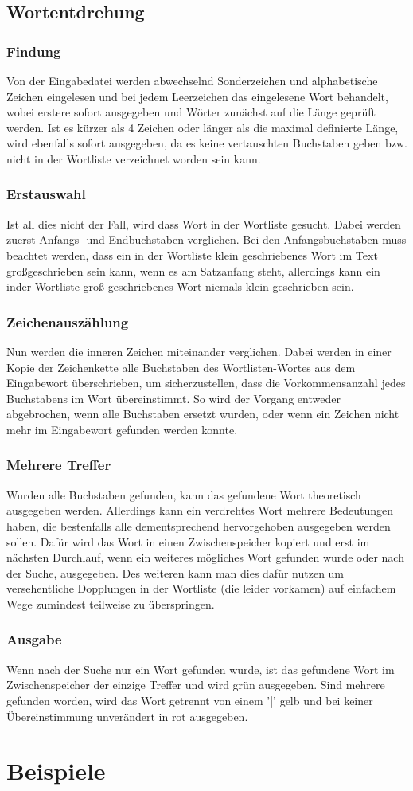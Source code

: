 \documentclass[a4paper,10pt,ngerman]{scrartcl}
\newcommand{\newsection}{\vspace{3\baselineskip}\section}
\newcommand{\newsubsection}{\vspace{2\baselineskip}\subsection}
\newcommand{\newsubsubsection}{\vspace{1\baselineskip}\subsubsection}
\begin{document}
\pagebreak
\newsubsection{Wortentdrehung}

\newsubsubsection{Findung}
Von der Eingabedatei werden abwechselnd Sonderzeichen und alphabetische Zeichen eingelesen und bei jedem Leerzeichen das eingelesene Wort behandelt, wobei erstere sofort ausgegeben und Wörter zunächst auf die Länge geprüft werden. Ist es kürzer als 4 Zeichen oder länger als die maximal definierte Länge, wird ebenfalls sofort ausgegeben, da es keine vertauschten Buchstaben geben bzw. nicht in der Wortliste verzeichnet worden sein kann.

\newsubsubsection{Erstauswahl}
Ist all dies nicht der Fall, wird dass Wort in der Wortliste gesucht. Dabei werden zuerst Anfangs- und Endbuchstaben verglichen. Bei den Anfangsbuchstaben muss beachtet werden, dass ein in der Wortliste klein geschriebenes Wort im Text großgeschrieben sein kann, wenn es am Satzanfang steht, allerdings kann ein inder Wortliste groß geschriebenes Wort niemals klein geschrieben sein.

\newsubsubsection{Zeichenauszählung}
Nun werden die inneren Zeichen miteinander verglichen. Dabei werden in einer Kopie der Zeichenkette alle Buchstaben des Wortlisten-Wortes aus dem Eingabewort überschrieben, um sicherzustellen, dass die Vorkommensanzahl jedes Buchstabens im Wort übereinstimmt. So wird der Vorgang entweder abgebrochen, wenn alle Buchstaben ersetzt wurden, oder wenn ein Zeichen nicht mehr im Eingabewort gefunden werden konnte.

\newsubsubsection{Mehrere Treffer}
Wurden alle Buchstaben gefunden, kann das gefundene Wort theoretisch ausgegeben werden. Allerdings kann ein verdrehtes Wort mehrere Bedeutungen haben, die bestenfalls alle dementsprechend hervorgehoben ausgegeben werden sollen. Dafür wird das Wort in einen Zwischenspeicher kopiert und erst im nächsten Durchlauf, wenn ein weiteres mögliches Wort gefunden wurde oder nach der Suche, ausgegeben. Des weiteren kann man dies dafür nutzen um versehentliche Dopplungen in der Wortliste (die leider vorkamen) auf einfachem Wege zumindest teilweise zu überspringen.

\newsubsubsection{Ausgabe}
Wenn nach der Suche nur ein Wort gefunden wurde, ist das gefundene Wort im Zwischenspeicher der einzige Treffer und wird grün ausgegeben. Sind mehrere gefunden worden, wird das Wort getrennt von einem '|' gelb und bei keiner Übereinstimmung unverändert in rot ausgegeben.



\pagebreak
\newsection{Beispiele}
\end{document}
